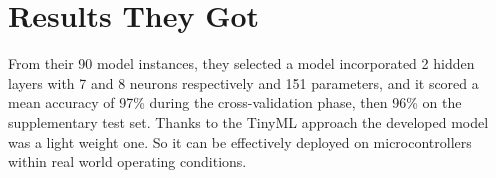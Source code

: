 \documentclass[../../main]{subfiles}
\begin{document}
\section{Results They Got} \label{sec:}

From their 90 model instances, they selected a model incorporated 2 hidden
layers with 7 and 8 neurons respectively and 151 parameters, and it scored a
mean accuracy of 97\% during the cross-validation phase, then 96\% on the
supplementary test set. Thanks to the TinyML approach the developed model
was a light weight one. So it can be effectively deployed on microcontrollers
within real world operating conditions.
\end{document}
